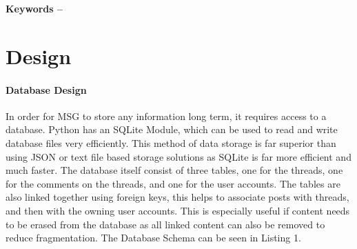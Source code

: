 \documentclass[10pt, a4paper]{article}
\title{\mytitle}
\author{\myauthor\hspace{1em}\\\contact\\Edinburgh Napier University\hspace{0.5em}-\hspace{0.5em}\mymodule}
\date{}
\begin{document}
	\maketitle
	\begin{abstract}
    One of the most important uses for the internet has been communication, from the early days of using Internet Relay Chat for text-based messaging to modern social media giants such as Facebook and YouTube, sharing high definition multimedia content with large numbers of people at once, the method of sharing and communicating information with others has always been a keen interest when developing for the web. One such method of sharing information is the forum, a virtual public notice board, mostly suited to question and answer style situations, such as tech support. Internet forums are extremely popular even today, with Stack Exchange\cite{StackExchange} being one of the largest internet forum networks in existence.
	\end{abstract}
    
	\textbf{Keywords -- }{\mykeywords}

	\section{Design}
	\paragraph{Database Design}
	In order for MSG to store any information long term, it requires access to a database. Python has an SQLite Module, which can be used to read and write database files very efficiently. This method of data storage is far superior than using JSON or text file based storage solutions as SQLite is far more efficient and much faster. The database itself consist of three tables, one for the threads, one for the comments on the threads, and one for the user accounts. The tables are also linked together using foreign keys, this helps to associate posts with threads, and then with the owning user accounts. This is especially useful if content needs to be erased from the database as all linked content can also be removed to reduce fragmentation.
	The Database Schema can be seen in Listing 1.
	
\end{document}
